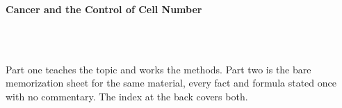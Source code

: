



\makeindex[title={Index of This Volume},columns=2,intoc]

\begin{titlepage}\thispagestyle{empty}
\vspace*{0.14\textheight}
\noindent{\color{tiercore}\rule{\textwidth}{5pt}}\\[3pt]
\noindent{\color{bioline}\rule{\textwidth}{1pt}}\\[26pt]
\\[12pt]
\noindent\begin{minipage}{\textwidth}\raggedright
{\sffamily\bfseries\fontsize{28}{32}\selectfont\color{bioink}%
 \hyphenchar{} Cancer and the Control of Cell Number\par}\end{minipage}\\[16pt]
\noindent{\color{biogreen}\rule{\textwidth}{1.4pt}}\\[10pt]
\noindent\begin{minipage}{\textwidth}\raggedright
{\fontsize{10.5}{14}\selectfont\color{biogreen}%
Part one teaches the topic and works the methods. Part two is the bare memorization sheet for the
same material, every fact and formula stated once with no commentary. The index at the back covers both.\par}\end{minipage}
\vfill
\noindent{\color{bioline}\rule{\textwidth}{1pt}}\\[3pt]
\noindent{\color{tiercore}\rule{\textwidth}{5pt}}
\end{titlepage}
\tableofcontents
\clearpage
{}
\clearpage
\printindex

